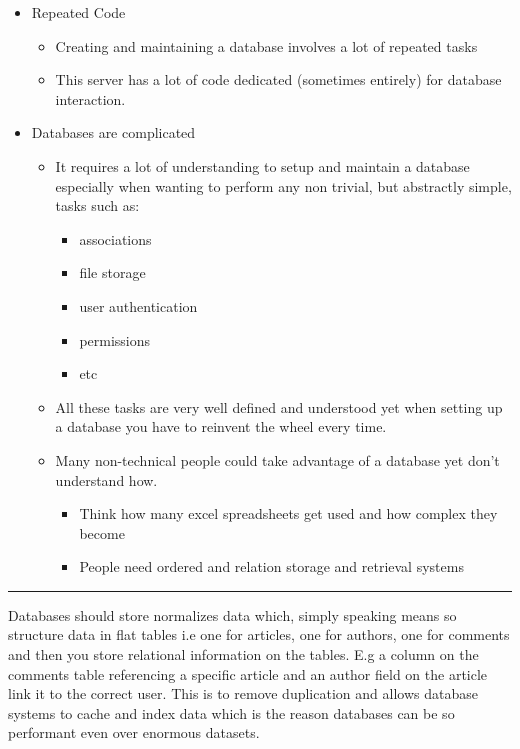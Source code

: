 \documentclass[
  12pt,
]{article}
\providecommand{\tightlist}{%
  \setlength{\itemsep}{0pt}\setlength{\parskip}{0pt}}
\begin{document}
\begin{itemize}
\item
  Repeated Code

  \begin{itemize}
  \item
    Creating and maintaining a database involves a lot of repeated tasks
  \item
    This server has a lot of code dedicated (sometimes entirely) for
    database interaction.
  \end{itemize}
\item
  Databases are complicated

  \begin{itemize}
  \item
    It requires a lot of understanding to setup and maintain a database
    especially when wanting to perform any non trivial, but abstractly
    simple, tasks such as:

    \begin{itemize}
    \tightlist
    \item
      associations
    \item
      file storage
    \item
      user authentication
    \item
      permissions
    \item
      etc
    \end{itemize}
  \item
    All these tasks are very well defined and understood yet when
    setting up a database you have to reinvent the wheel every time.
  \item
    Many non-technical people could take advantage of a database yet
    don't understand how.

    \begin{itemize}
    \tightlist
    \item
      Think how many excel spreadsheets get used and how complex they
      become
    \item
      People need ordered and relation storage and retrieval systems
    \end{itemize}
  \end{itemize}
\end{itemize}

\begin{center}\rule{0.5\linewidth}{\linethickness}\end{center}

Databases should store normalizes data which, simply speaking means so
structure data in flat tables i.e one for articles, one for authors, one
for comments and then you store relational information on the tables.
E.g a column on the comments table referencing a specific article and an
author field on the article link it to the correct user. This is to
remove duplication and allows database systems to cache and index data
which is the reason databases can be so performant even over enormous
datasets.
\end{document}
